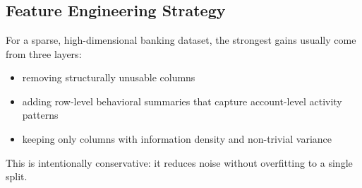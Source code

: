 \documentclass[11pt]{article}
\providecommand{\tightlist}{%
      \setlength{\itemsep}{0pt}\setlength{\parskip}{0pt}}
\begin{document}
    \begin{center}
    \end{center}
    { \hspace*{\fill} \\}
    
    \begin{center}
    \end{center}
    { \hspace*{\fill} \\}
    
    \begin{center}
    \end{center}
    { \hspace*{\fill} \\}
    
    \subsection{Feature Engineering
Strategy}\label{feature-engineering-strategy}

For a sparse, high-dimensional banking dataset, the strongest gains
usually come from three layers:

\begin{itemize}
\tightlist
\item
  removing structurally unusable columns
\item
  adding row-level behavioral summaries that capture account-level
  activity patterns
\item
  keeping only columns with information density and non-trivial variance
\end{itemize}

This is intentionally conservative: it reduces noise without overfitting
to a single split.
\end{document}
